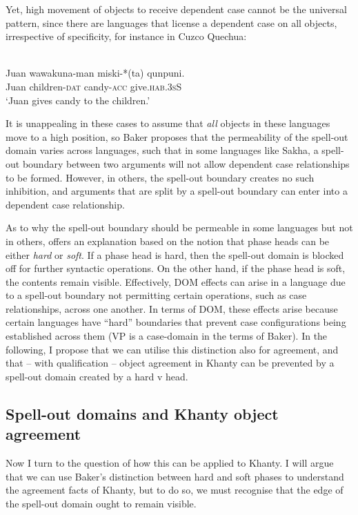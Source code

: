 \documentclass[output=paper
,modfonts
,nonflat]{langsci/langscibook}
\begin{document}
\noindent Yet, high movement of objects to receive dependent case cannot be the universal pattern, since there are languages that license a dependent case on all objects, irrespective of specificity, for instance in Cuzco Quechua:

\begin{exe}
\ex {}\\
\gll Juan wawakuna-man miski-*(ta) qunpuni.\\
Juan children-\textsc{dat} candy-\textsc{acc} give.\textsc{hab.3sS}\\
\glt `Juan gives candy to the children.'
\end{exe}

\noindent It is unappealing in these cases to assume that \emph{all} objects in these languages move to a high position, so Baker proposes that the permeability of the spell-out domain varies across languages, such that in some languages like Sakha, a spell-out boundary between two arguments will not allow dependent case relationships to be formed.
However, in others, the spell-out boundary creates no such inhibition, and arguments that are split by a spell-out boundary can enter into a dependent case relationship.

As to why the spell-out boundary should be permeable in some languages but not in others, \citeauthor{Baker2015} offers an explanation based on the notion that phase heads can be either \emph{hard} or \emph{soft}.
If a phase head is hard, then the spell-out domain is blocked off for further syntactic operations.
On the other hand, if the phase head is soft, the contents remain visible.
Effectively, DOM effects can arise in a language due to a spell-out boundary not permitting certain operations, such as case relationships, across one another.
In terms of DOM, these effects arise because certain languages have ``hard'' boundaries that prevent case configurations being established across them (VP is a case-domain in the terms of Baker).
In the following, I propose that we can utilise this distinction also for agreement, and that -- with qualification -- object agreement in Khanty can be prevented by a spell-out domain created by a hard v head.


\subsection{Spell-out domains and Khanty object agreement}

Now I turn to the question of how this can be applied to Khanty.
I will argue that we can use Baker's distinction between hard and soft phases to understand the agreement facts of Khanty, but to do so, we must recognise that the edge of the spell-out domain ought to remain visible.
\end{document}
